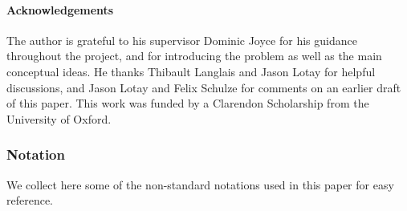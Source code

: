\documentclass[10pt, a4paper]{article}
\theoremstyle{plain}%
\theoremstyle{definition}
\numberwithin{figure}{section}
\numberwithin{equation}{section}
\begin{document}
\paragraph*{\textbf{Acknowledgements}} The author is grateful to his supervisor Dominic Joyce for his guidance throughout the project, and for introducing the problem as well as the main conceptual ideas. He thanks Thibault Langlais and Jason Lotay for helpful discussions, and Jason Lotay and Felix Schulze for comments on an earlier draft of this paper. This work was funded by a Clarendon Scholarship from the University of Oxford.

\subsubsection*{Notation} We collect here some of the non-standard notations used in this paper for easy reference.
\end{document}
